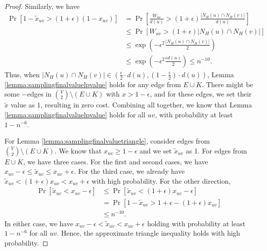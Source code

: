 \documentclass[11pt]{article}
\begin{document}
\begin{CJK*}{UTF8}{gbsn}
\begin{proof}
Similarly, we have
\begin{align*}
    \Pr[1 - \tilde{x}_{uv} > (1 + \epsilon)(1 - x_{uv})] &= \Pr[\frac{W_{uv}}{d(u)} > (1 + \epsilon) \frac{|N_H(u) \cap N_H(v)|}{d(u)}] \\
    &\leq \Pr[W_{uv} > (1 + \epsilon) |N_H(u) \cap N_H(v)|] \\
    &\leq \exp\left( -\epsilon^2 \frac{|N_H(u) \cap N_H(v)|}{2}\right) \\
    &\leq \exp\left( -\epsilon^2 \frac{\epsilon d(u)}{2}\right) \leq n^{-10}.
\end{align*}
Thus, when $|N_H(u) \cap N_H(v)| \in \left( \frac{\epsilon}{2} \cdot d(u), (1 - \frac{\epsilon}{2}) \cdot d(u) \right)$, Lemma \ref{lemma:samplingfinalvaluelpvalue} holds for any edge from $E \cup K$. There might be some $-$edges in $\binom{V}{2} \setminus (E \cup K)$ with $x > 1 - \epsilon$, and for these edges, we set their $\widetilde{x}$ value as 1, resulting in zero cost. Combining all together, we know that Lemma \ref{lemma:samplingfinalvaluelpvalue} holds for all $uv$, with probability at least $1 - n^{-6}$.

For Lemma \ref{lemma:samplingfinalvaluetriangle}, consider edges from $\binom{V}{2} \setminus (E \cup K)$. We know that $x_{uv} \geq 1 - \epsilon$ and we set $\tilde{x}_{uv}$ as 1. For edges from $E \cup K$, we have three cases. For the first and second cases, we have $x_{uv} - \epsilon \leq \tilde{x}_{uv} \leq x_{uv} + \epsilon$. For the third case, we already have $\tilde{x}_{uv} < (1 + \epsilon)x_{uv} < x_{uv} + \epsilon$ with high probability. For the other direction,
\begin{align*}
    \Pr[\tilde{x}_{uv} < x_{uv} - \epsilon] &\leq \Pr[\tilde{x}_{uv} < (1 + \epsilon)x_{uv} - \epsilon] \\
    &= \Pr[1 - \tilde{x}_{uv} > 1 + \epsilon - (1 + \epsilon)x_{uv}] \\
    &\leq n^{-10}.
\end{align*}
In either case, we have $x_{uv} - \epsilon < \tilde{x}_{uv} < x_{uv} + \epsilon$ holding with probability at least $1 - n^{-6}$ for all $uv$. Hence, the approximate triangle inequality holds with high probability.




















































\end{proof}
\end{CJK*}
\end{document}
